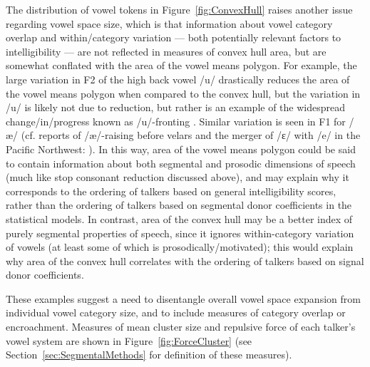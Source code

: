 The distribution of vowel tokens in Figure~\ref{fig:ConvexHull} raises another issue regarding vowel space size, which is that information about vowel category overlap and within\-/category variation — both potentially relevant factors to intelligibility — are not reflected in measures of convex hull area, but are somewhat conflated with the area of the vowel means polygon.  For example, the large variation in F2 of the high back vowel /u/ drastically reduces the area of the vowel means polygon when compared to the convex hull, but the variation in /u/ is likely not due to reduction, but rather is an example of the widespread change\-/in\-/progress known as /u/-fronting \citep[chap.\ 12]{LabovEtAl2006}.  Similar variation is seen in F1 for /æ/ (cf. reports of /æ/-raising before velars and the merger of /ɛ/ with /e/ in the Pacific Northwest: \citealt{Reed1952, WassinkEtAl2009}).  In this way, area of the vowel means polygon could be said to contain information about both segmental and prosodic dimensions of speech (much like stop consonant reduction discussed above), and may explain why it corresponds to the ordering of talkers based on general intelligibility scores, rather than the ordering of talkers based on segmental donor coefficients in the statistical models.  In contrast, area of the convex hull may be a better index of purely segmental properties of speech, since it ignores within-category variation of vowels (at least some of which is prosodically\-/motivated); this would explain why area of the convex hull correlates with the ordering of talkers based on signal donor coefficients.

These examples suggest a need to disentangle overall vowel space expansion from individual vowel category size, and to include measures of category overlap or encroachment.  Measures of mean cluster size and repulsive force of each talker’s vowel system are shown in Figure~\ref{fig:ForceCluster} (see Section~\ref{sec:SegmentalMethods} for definition of these measures).

